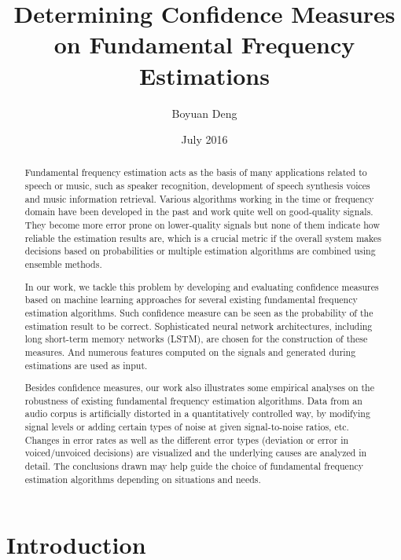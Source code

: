 \documentclass[11pt,a4paper]{report}
\title{Determining Confidence Measures on Fundamental Frequency Estimations}
\author{Boyuan Deng}
\date{July 2016}
\begin{document}
\maketitle



\begin{abstract}
Fundamental frequency estimation acts as the basis of many applications related to speech or music, such as speaker recognition, development of speech synthesis voices and music information retrieval.
Various algorithms working in the time or frequency domain have been developed in the past and work quite well on good-quality signals.
They become more error prone on lower-quality signals but none of them indicate how reliable the estimation results are, which is a crucial metric if the overall system makes decisions based on probabilities or multiple estimation algorithms are combined using ensemble methods.

In our work, we tackle this problem by developing and evaluating confidence measures based on machine learning approaches for several existing fundamental frequency estimation algorithms.
Such confidence measure can be seen as the probability of the estimation result to be correct.
Sophisticated neural network architectures, including long short-term memory networks (LSTM), are chosen for the construction of these measures.
And numerous features computed on the signals and generated during estimations are used as input.

Besides confidence measures, our work also illustrates some empirical analyses on the robustness of existing fundamental frequency estimation algorithms.
Data from an audio corpus is artificially distorted in a quantitatively controlled way, by modifying signal levels or adding certain types of noise at given signal-to-noise ratios, etc.
Changes in error rates as well as the different error types (deviation or error in voiced/unvoiced decisions) are visualized and the underlying causes are analyzed in detail.
The conclusions drawn may help guide the choice of fundamental frequency estimation algorithms depending on situations and needs.
\end{abstract}

\tableofcontents

\listoffigures
\listoftables

\chapter{Introduction}
\end{document}
